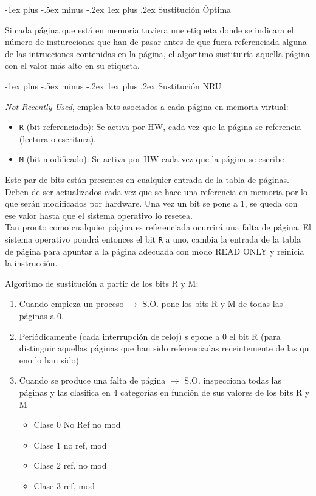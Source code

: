 \documentclass[10pt,portrait, twocolumn]{article}
\makeatletter
\renewcommand{\subsubsection}{\@startsection{subsubsection}{3}{0mm}%
                                {-1ex plus -.5ex minus -.2ex}%
                                {1ex plus .2ex}%
                                {\normalfont\small\bfseries}}
\makeatother
\begin{document}
\subsubsection{Sustitución Óptima}

Si cada página que está en memoria tuviera une etiqueta donde se indicara el número de insturcciones que han de pasar antes de que fuera referenciada alguna de las intrucciones contenidas en la página, el algoritmo sustituiría aquella página con el valor más alto en su etiqueta.

\subsubsection{Sustitución NRU}

\textit{Not Recently Used}, emplea bits asociados a cada página en memoria virtual:

	\begin{itemize}
	\item 	\texttt{R} (bit referenciado): Se activa por HW, cada vez que la página se referencia (lectura o escritura).
	\item \texttt{M} (bit modificado): Se activa por HW cada vez que la página se escribe
	\end{itemize}
	
Este par de bits están presentes en cualquier entrada de la tabla de páginas. Deben de ser actualizados cada vez que se hace una referencia en memoria por lo que serán modificados por hardware. Una vez un bit se pone a 1, se queda con ese valor hasta que el sistema operativo lo resetea.\\

Tan pronto como cualquier página es referenciada ocurrirá una falta de página. El sistema operativo pondrá entonces el bit \texttt{R} a uno, cambia la entrada de la tabla de página para apuntar a la página adecuada con modo READ ONLY y reinicia la instrucción.

Algoritmo de sustitución a partir de los bits R y M:

	\begin{enumerate}
		\item Cuando empieza un proceso $\rightarrow$ S.O. pone los bits R y M de todas las páginas a 0.
		\item Periódicamente (cada interrupción de reloj) s epone a 0 el bit R (para distinguir aquellas páginas que han sido referenciadas receintemente de las qu eno lo han sido)
		\item Cuando se produce una falta de página $\rightarrow$ S.O. inspecciona todas las páginas y las clasifica en 4 categorías en función de sus valores de los bits R y M
		
			\begin{itemize}
			\item Clase 0 No Ref no mod
			\item Clase 1 no ref, mod
			\item Clase 2 ref, no mod
			\item Clase 3 ref, mod
			\end{itemize}
	\end{enumerate}
	
\end{document}
